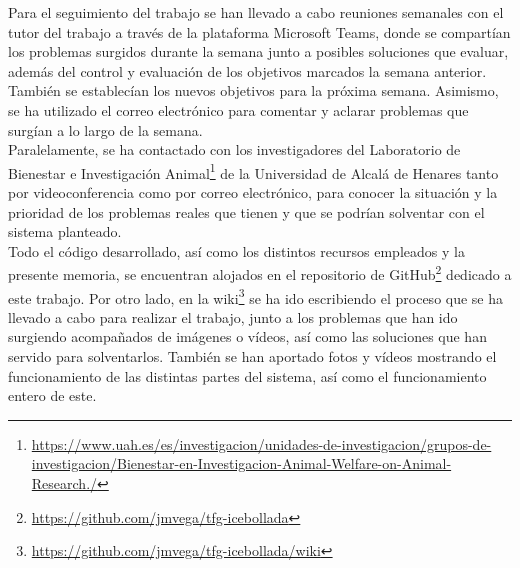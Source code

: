 Para el seguimiento del trabajo se han llevado a cabo reuniones semanales con el tutor del trabajo a través de la plataforma Microsoft Teams, donde se compartían los problemas surgidos durante la semana junto a posibles soluciones que evaluar, además del control y evaluación de los objetivos marcados la semana anterior. También se establecían los nuevos objetivos para la próxima semana. Asimismo, se ha utilizado el correo electrónico para comentar y aclarar problemas que surgían a lo largo de la semana.\\

Paralelamente, se ha contactado con los investigadores del Laboratorio de Bienestar e Investigación Animal\footnote{\url{https://www.uah.es/es/investigacion/unidades-de-investigacion/grupos-de-investigacion/Bienestar-en-Investigacion-Animal-Welfare-on-Animal-Research./}} de la Universidad de Alcalá de Henares tanto por videoconferencia como por correo electrónico, para conocer la situación y la prioridad de los problemas reales que tienen y que se podrían solventar con el sistema planteado.\\

Todo el código desarrollado, así como los distintos recursos empleados y la presente memoria, se encuentran alojados en el repositorio de GitHub\footnote{\url{https://github.com/jmvega/tfg-icebollada}} dedicado a este trabajo. Por otro lado, en la wiki\footnote{\url{https://github.com/jmvega/tfg-icebollada/wiki}} se ha ido escribiendo el proceso que se ha llevado a cabo para realizar el trabajo, junto a los problemas que han ido surgiendo acompañados de imágenes o vídeos, así como las soluciones que han servido para solventarlos. También se han aportado fotos y vídeos mostrando el funcionamiento de las distintas partes del sistema, así como el funcionamiento entero de este.
